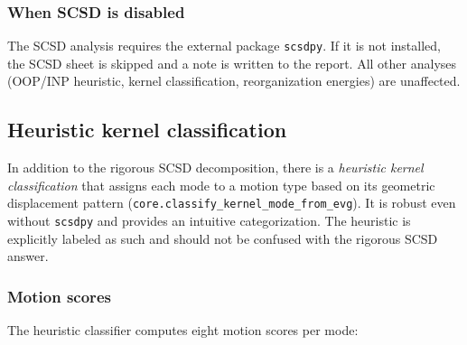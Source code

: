 \documentclass[11pt,a4paper,twoside]{article}
\theoremstyle{remark}
\begin{document}
\subsubsection*{When SCSD is disabled}

The SCSD analysis requires the external package \texttt{scsdpy}. If
it is not installed, the SCSD sheet is skipped and a note is written
to the report. All other analyses (OOP/INP heuristic, kernel
classification, reorganization energies) are unaffected.

\subsection{Heuristic kernel classification}
\label{sec:kern-klassifikation}

In addition to the rigorous SCSD decomposition, there is a
\emph{heuristic kernel classification} that assigns each mode to a
motion type based on its geometric displacement pattern
(\texttt{core.classify\_kernel\_mode\_from\_evg}). It is robust even
without \texttt{scsdpy} and provides an intuitive categorization. The
heuristic is explicitly labeled as such and should not be confused
with the rigorous SCSD answer.

\subsubsection*{Motion scores}

The heuristic classifier computes eight motion scores per mode:
\end{document}
